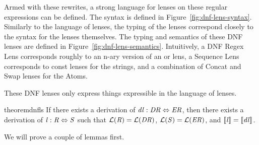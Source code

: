 Armed with these rewrites, a strong language for lenses on these regular
expressions can be defined.
The syntax is defined in Figure~\ref{fig:dnf-lens-syntax}.
Similarly to the language of lenses, the typing of the lenses
correspond closely to the syntax for the lenses themselves.
The typing and semantics of these DNF lenses are defined in Figure~\ref{fig:dnf-lens-semantics}.
Intuitively, a DNF Regex Lens corresponds roughly to an n-ary version of an or lens,
a Sequence Lens corresponds to const lenses for the strings, and a combination of
Concat and Swap lenses for the Atoms.

These DNF lenses only express things expressible in the language of lenses.
\begin{restatable}{theorem}{dnfls}
\label{thm:dnfls}
If there exists a derivation of $\mathit{dl} : \mathit{DR} \Leftrightarrow \mathit{ER}$,
then there exists a derivation of $\mathit{l} : \mathit{R} \Leftrightarrow \mathit{S}$ such that
$\mathcal{L}(\mathit{R})=\mathcal{L}(\mathit{DR})$,
$\mathcal{L}(\mathit{S})=\mathcal{L}(\mathit{ER})$, and
$[ \! [\mathit{l}] \! ]=[ \! [\mathit{dl}] \! ]$.
\end{restatable}
We will prove a couple of lemmas first.

